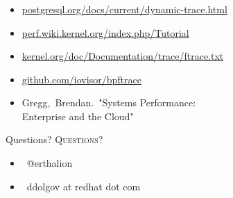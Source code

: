 \documentclass[usenames,dvipsnames, 18pt, compress, aspectratio=169]{beamer}
\def\twitter{{\faTwitter}}
\def\email{{\faEnvelope}}
\begin{document}
\renewcommand\UrlFont{\color{black}\rmfamily}
\begin{frame}[fragile]{}
    \frametitle{}
    \begin{center}
        \begin{itemize}[label={}]
            \item {\url{postgresql.org/docs/current/dynamic-trace.html}}
            \item {\url{perf.wiki.kernel.org/index.php/Tutorial}}
            \item {\url{kernel.org/doc/Documentation/trace/ftrace.txt}}
            \item {\url{github.com/iovisor/bpftrace}}
            \item {Gregg, Brendan. "Systems Performance: \\ Enterprise and the Cloud"}
        \end{itemize}
    \end{center}
\end{frame}

\fontsize{18pt}{18}\selectfont
\begin{frame}
  \vspace*{2.5cm}
  \begin{minipage}[b][\paperheight]{\textwidth}
  \begin{center}

      \linespread{1.0}%
      \if@noSmallCapitals%
        Questions?
      \else%
        \scshape{\color{black} Questions?}%
      \fi%
      \vspace*{0.3em}

      \fontsize{13pt}{14}\selectfont
        \begin{itemize}[label={}]
            \item {\color{black} \twitter\ @erthalion}
            \item {\color{black} \email\ ddolgov at redhat dot com}
        \end{itemize}
      \vspace*{2.5em}%

    \vfill
    \vspace*{2em}
  \end{center}
  \end{minipage}

\end{frame}
\end{document}
